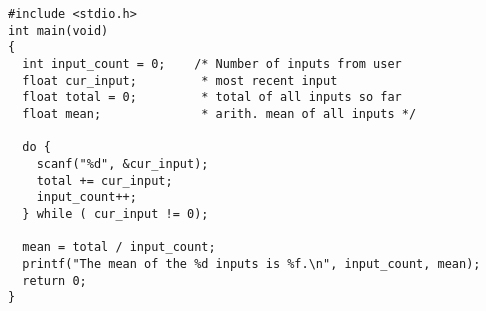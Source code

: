 \begin{verbatim}
#include <stdio.h>
int main(void)
{
  int input_count = 0;    /* Number of inputs from user 
  float cur_input;         * most recent input 
  float total = 0;         * total of all inputs so far 
  float mean;              * arith. mean of all inputs */

  do {
    scanf("%d", &cur_input);
    total += cur_input;
    input_count++; 
  } while ( cur_input != 0);  

  mean = total / input_count;
  printf("The mean of the %d inputs is %f.\n", input_count, mean);
  return 0;
}
\end{verbatim}
